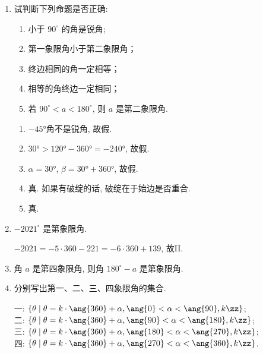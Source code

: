 \begin{enumerate}
    \item 试判断下列命题是否正确:
    \begin{enumerate}
        \item 小于 $90^{\circ}$ 的角是锐角;\dotfill{( )}
        \item 第一象限角小于第二象限角；\dotfill{( )}
        \item 终边相同的角一定相等；\dotfill{( )}
        \item 相等的角终边一定相同；\dotfill{( )}
        \item 若 $90^{\circ}<a<180^{\circ}$, 则 $a$ 是第二象限角.\dotfill{( )}
    \end{enumerate}
    \begin{jieda}
    \begin{enumerate}[(1)]
    \item $-\ang{45}$角不是锐角, 故假. 
    \item $\ang{30}>\ang{120}-\ang{360}=-\ang{240}$, 故假. 
    \item $\alpha=\ang{30}$, $\beta=\ang{30}+\ang{360}$, 故假. 
    \item 真. 如果有破绽的话, 破绽在于始边是否重合. 
    \item 真. 
    \end{enumerate}
    \end{jieda}

    \item $-2021^{\circ}$ 是第象限角.
    \begin{jieda}
    $-2021=-5\cdot360-221=-6\cdot 360+139$, 故II. 
    \end{jieda}

    \item 角 $a$ 是第四象限角, 则角 $180^{\circ}-a$ 是第象限角.

    
    \item 分别写出第一、二、三、四象限角的集合. 
    \begin{jieda}
    一: $\{\theta\mid\theta=k\cdot\ang{360}+\alpha,\ang{0}<\alpha<\ang{90},k\zz\}$; \\
    二: $\{\theta\mid\theta=k\cdot\ang{360}+\alpha,\ang{90}<\alpha<\ang{180},k\zz\}$; \\
    三: $\{\theta\mid\theta=k\cdot\ang{360}+\alpha,\ang{180}<\alpha<\ang{270},k\zz\}$; \\
    四: $\{\theta\mid\theta=k\cdot\ang{360}+\alpha,\ang{270}<\alpha<\ang{360},k\zz\}$. 
    \end{jieda}


\end{enumerate}
